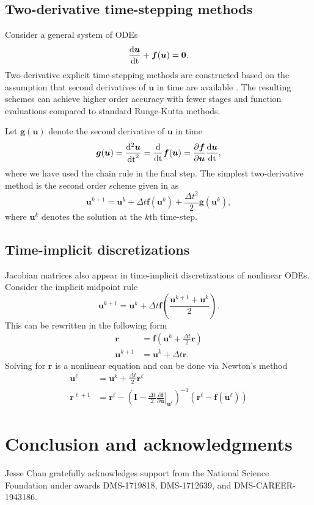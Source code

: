 \documentclass{article}
\newcommand{\td}[2]{\frac{{\rm d}#1}{{\rm d}{\rm #2}}}
\newcommand{\pd}[2]{\frac{\partial#1}{\partial#2}}
\newcommand{\LRp}[1]{\left( #1 \right)}
\newcommand{\LRl}[1]{\left. #1 \right|}
\newcommand{\eq}[1]{\begin{align*}#1\end{align*}}
\begin{document}
\subsection{Two-derivative time-stepping methods}

Consider a general system of ODEs
\[
\td{\bm{u}}{t} + \bm{f}(\bm{u}) = \bm{0}.
\]
Two-derivative explicit time-stepping methods are constructed based on the assumption that second derivatives of $\bm{u}$ in time are available \cite{chan2010explicit, christlieb2016explicit}.  The resulting schemes can achieve higher order accuracy with fewer stages and function evaluations compared to standard Runge-Kutta methods.  

Let $\bm{g}(\bm{u})$ denote the second derivative of $\bm{u}$ in time
\[
\bm{g}(\bm{u}) = \frac{{\rm d}^2 \bm{u}}{{\rm dt}^2} = \td{}{t} \bm{f}(\bm{u}) = \pd{\bm{f}}{\bm{u}}\td{\bm{u}}{t},
\]
where we have used the chain rule in the final step.  The simplest two-derivative method is the second order scheme given in \cite{chan2010explicit} as
\[
\bm{u}^{k+1} = \bm{u}^k + \Delta t \bm{f}(\bm{u}^k) + \frac{\Delta t^2}{2} \bm{g}(\bm{u}^k),
\]
where $\bm{u}^k$ denotes the solution at the $k$th time-step.  



\subsection{Time-implicit discretizations}

Jacobian matrices also appear in time-implicit discretizations of nonlinear ODEs.  Consider the implicit midpoint rule 
\[
\bm{u}^{k+1} = \bm{u}^k + \Delta t \bm{f}\LRp{\frac{\bm{u}^{k+1} + \bm{u}^k}{2}}.
\]
This can be rewritten in the following form
\eq{
\bm{r} &= \bm{f}\LRp{\bm{u}^k + \frac{\Delta t}{2}\bm{r}}\\
\bm{u}^{k+1} &= \bm{u}^k + \Delta t \bm{r}.
}
Solving for $\bm{r}$ is a nonlinear equation and can be done via Newton's method
\eq{
\bm{u}^\ell &= \bm{u}^k + \frac{\Delta t}{2}\bm{r}^\ell\\
\bm{r}^{\ell + 1} &= \bm{r}^\ell - \LRp{\bm{I} - \frac{\Delta t}{2}\LRl{\pd{\bm{f}}{\bm{u}}}_{\bm{u}^{\ell}}}^{-1} \LRp{\bm{r}^\ell - \bm{f}\LRp{\bm{u}^\ell}}
}

\section{Conclusion and acknowledgments}

Jesse Chan gratefully acknowledges support from the National Science Foundation under awards DMS-1719818, DMS-1712639, and DMS-CAREER-1943186.  



\end{document}
